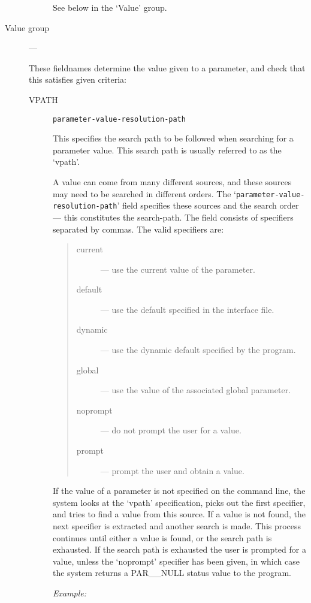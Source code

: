 \begin{description}
\begin{description}
See below in the `Value' group.

\end{description}

\item [Value group] ---

These fieldnames determine the value given to a parameter, and check that this
satisfies given criteria:

\begin{description}

\item [VPATH] {\tt parameter-value-resolution-path}

This specifies the search path to be followed when searching for a parameter
value.
This search path is usually referred to as the `vpath'.

A value can come from many different sources, and these sources may need to be
searched in different orders.
The `\verb+parameter-value-resolution-path+' field specifies these sources
and the search order --- this constitutes the search-path.
The field consists of specifiers separated by commas.
The valid specifiers are:
\begin{quote}
\begin{description}
\item [current] --- use the current value of the parameter.
\item [default] --- use the default specified in the interface file.
\item [dynamic] --- use the dynamic default specified by the program.
\item [global] --- use the value of the associated global parameter.
\item [noprompt] --- do not prompt the user for a value.
\item [prompt] --- prompt the user and obtain a value.
\end{description}
\end{quote}
If the value of a parameter is not specified on the command line, the system
looks at the `vpath' specification, picks out the first specifier, and tries
to find a value from this source.
If a value is not found, the next specifier is extracted and another search is
made.
This process continues until either a value is found, or the search path is
exhausted.
If the search path is exhausted the user is prompted for a value, unless
the `noprompt' specifier has been given, in which case the system returns a
PAR\_\_NULL status value to the program.

{\em Example:}


\end{description}
\end{description}
